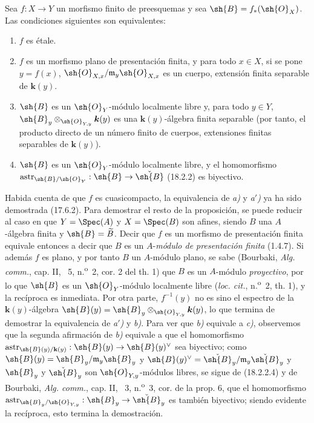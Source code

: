
\begin{proposition}[18.2.3]
\label{IV.18.2.3}
Sea $f:X\to Y$ un morfismo \textup{finito} de preesquemas y sea $\sh{B}=f_*(\sh{O}_X)$. Las condiciones siguientes son equivalentes:
\begin{enumerate}
  \item[\textup{a)}] $f$ es étale.
  \item[\textup{a$'$)}] $f$ es un morfismo plano de presentación finita, y para todo $x\in X$, si se pone $y=f(x)$, $\sh{O}_{X,x}/\mathfrak m_y\sh{O}_{X,x}$ es un cuerpo, extensión finita separable de $\boldsymbol k(y)$.
  \item[\textup{b)}] $\sh{B}$ es un $\sh{O}_Y$-módulo localmente libre y, para todo $y\in Y$, $\sh{B}_y\otimes_{\sh{O}_{Y,y}}\boldsymbol k(y)$ es una $\boldsymbol k(y)$-álgebra finita separable \textup{(por tanto, el producto directo de un número finito de cuerpos, extensiones finitas separables de $\boldsymbol k(y)$)}.
  \item[\textup{c)}] $\sh{B}$ es un $\sh{O}_Y$-módulo localmente libre, y el homomorfismo $\operatorname{astr}_{\sh{B}/\sh{O}_Y}:\sh{B}\to\check{\sh{B}}$ \textup{(18.2.2)} es biyectivo.
\end{enumerate}
\end{proposition}

Habida cuenta de que $f$ es cuasicompacto, la equivalencia de \emph{a)} y \emph{a$'$)} ya ha sido demostrada (17.6.2). Para demostrar el resto de la proposición, se puede reducir al caso en que $Y=\Spec(A)$ y $X=\Spec(B)$ son afines, siendo $B$ una $A$-álgebra finita y $\sh{B}=\widetilde B$. Decir que $f$ es un morfismo de presentación finita equivale entonces a decir que $B$ es un $A$-\emph{módulo de presentación finita} (1.4.7). Si además $f$ es plano, y por tanto $B$ un $A$-módulo plano, se sabe (Bourbaki, \emph{Alg. comm.}, cap. II, \textsection~5, n.\textsuperscript{o}~2, cor. 2 del th. 1) que $B$ es un $A$-módulo \emph{proyectivo}, por lo que $\sh{B}$ es un $\sh{O}_Y$-módulo localmente libre (\emph{loc. cit.}, n.\textsuperscript{o}~2, th. 1), y la recíproca es inmediata. Por otra parte, $f^{-1}(y)$ no es sino el espectro de la $\boldsymbol k(y)$-álgebra $\sh{B}(y)=\sh{B}_y\otimes_{\sh{O}_{Y,y}}\boldsymbol k(y)$, lo que termina de demostrar la equivalencia de \emph{a$'$)} y \emph{b)}. Para ver que \emph{b)} equivale a \emph{c)}, observemos que la segunda afirmación de \emph{b)} equivale a que el homomorfismo $\operatorname{astr}_{\sh{B}(y)/\mathbf k(y)}:\sh{B}(y)\to\sh{B}(y)^\vee$ sea biyectivo; como $\sh{B}(y)=\sh{B}_y/\mathfrak m_y\sh{B}_y$ y $\sh{B}(y)^\vee=\check{\sh{B}}_y/\mathfrak m_y\check{\sh{B}}_y$ y $\sh{B}_y$ y $\check{\sh{B}}_y$ son $\sh{O}_{Y,y}$-módulos libres, se sigue de (18.2.2.4) y de Bourbaki, \emph{Alg. comm.}, cap. II, \textsection~3, n.\textsuperscript{o}~3, cor. de la prop. 6, que el homomorfismo $\operatorname{astr}_{\sh{B}_y/\sh{O}_{Y,y}}:\sh{B}_y\to\check{\sh{B}}_y$ es también biyectivo; siendo evidente la recíproca, esto termina la demostración.


